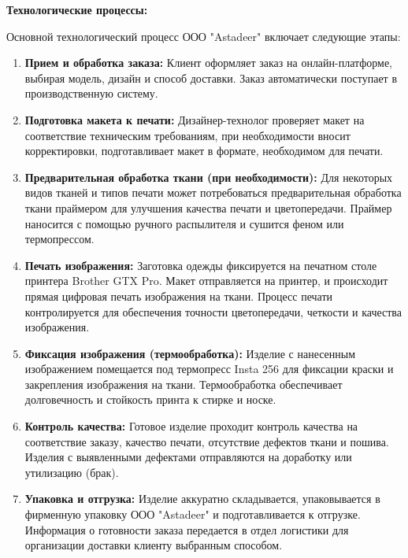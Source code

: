 \vspace{0.3cm}

\textbf{Технологические процессы:}

Основной технологический процесс ООО "Astadeer" включает следующие этапы:

\begin{enumerate}
    \item \textbf{Прием и обработка заказа:} Клиент оформляет заказ на онлайн-платформе, выбирая модель, дизайн и способ доставки.  Заказ автоматически поступает в производственную систему.
    \item \textbf{Подготовка макета к печати:} Дизайнер-технолог проверяет макет на соответствие техническим требованиям, при необходимости вносит корректировки, подготавливает макет в формате, необходимом для печати.
    \item \textbf{Предварительная обработка ткани (при необходимости):}  Для некоторых видов тканей и типов печати может потребоваться предварительная обработка ткани праймером для улучшения качества печати и цветопередачи.  Праймер наносится с помощью ручного распылителя и сушится феном или термопрессом.
    \item \textbf{Печать изображения:}  Заготовка одежды фиксируется на печатном столе принтера Brother GTX Pro.  Макет отправляется на принтер, и происходит прямая цифровая печать изображения на ткани.  Процесс печати контролируется для обеспечения точности цветопередачи, четкости и качества изображения.
    \item \textbf{Фиксация изображения (термообработка):}  Изделие с нанесенным изображением помещается под термопресс Insta 256 для фиксации краски и закрепления изображения на ткани.  Термообработка обеспечивает долговечность и стойкость принта к стирке и носке.
    \item \textbf{Контроль качества:}  Готовое изделие проходит контроль качества на соответствие заказу, качество печати, отсутствие дефектов ткани и пошива.  Изделия с выявленными дефектами отправляются на доработку или утилизацию (брак).
    \item \textbf{Упаковка и отгрузка:}  Изделие аккуратно складывается, упаковывается в фирменную упаковку ООО "Astadeer" и подготавливается к отгрузке.  Информация о готовности заказа передается в отдел логистики для организации доставки клиенту выбранным способом.
\end{enumerate}

\vspace{0.3cm}

